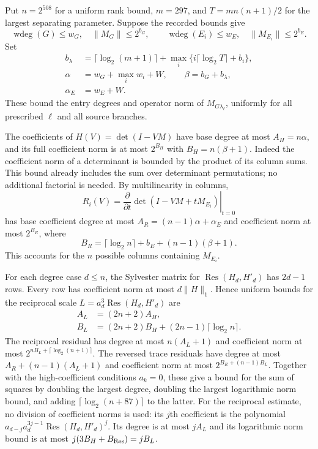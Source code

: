Put $n=2^{508}$ for a uniform rank bound, $m=297$, and
$T=m n(n+1)/2$ for the largest separating parameter. Suppose the
recorded bounds give
\[
 \operatorname{wdeg}(G)\le w_G,\quad \|M_G\|\le2^{b_G},\qquad
 \operatorname{wdeg}(E_i)\le w_E,\quad \|M_{E_i}\|\le2^{b_E}.
\]
Set
\begin{align*}
 b_\lambda&=\lceil\log_2(m+1)\rceil
       +\max_i\{i\lceil\log_2 T\rceil+b_i\},\\
 \alpha&=w_G+\max_i w_i+W,\qquad \beta=b_G+b_\lambda,\\
 \alpha_E&=w_E+W.
\end{align*}
These bound the entry degrees and operator norm of
$M_{G\lambda_\ell}$, uniformly for all prescribed $\ell$ and all
source branches.

The coefficients of $H(V)=\det(I-VM)$ have base degree at most
$A_H=n\alpha$, and its full coefficient norm is at most
$2^{B_H}$ with $B_H=n(\beta+1)$. Indeed the coefficient norm of a
determinant is bounded by the product of its column sums. This bound
already includes the sum over determinant permutations; no additional
factorial is needed. By multilinearity in columns,
\[
 R_i(V)=\left.\frac{\partial}{\partial t}
       \det(I-VM+tM_{E_i})\right|_{t=0}
\]
has base coefficient degree at most
$A_R=(n-1)\alpha+\alpha_E$ and coefficient norm at most $2^{B_R}$,
where
\[
 B_R=\lceil\log_2 n\rceil+b_E+(n-1)(\beta+1).
\]
This accounts for the $n$ possible columns containing $M_{E_i}$.

For each degree case $d\le n$, the Sylvester matrix for
$\operatorname{Res}(H_d,H'_d)$ has $2d-1$ rows. Every row has
coefficient norm at most $d\|H\|_1$. Hence uniform bounds for the
reciprocal scale $L=a_d^3\operatorname{Res}(H_d,H'_d)$ are
\begin{align*}
 A_L&=(2n+2)A_H,\\
 B_L&=(2n+2)B_H+(2n-1)\lceil\log_2 n\rceil.
\end{align*}
The reciprocal residual has degree at most $n(A_L+1)$ and coefficient
norm at most $2^{nB_L+\lceil\log_2(n+1)\rceil}$. The reversed trace
residuals have degree at most $A_R+(n-1)(A_L+1)$ and coefficient norm
at most $2^{B_R+(n-1)B_L}$. Together with the high-coefficient
conditions $a_k=0$, these give a bound for the sum of squares by
doubling the largest degree, doubling the largest logarithmic norm
bound, and adding $\lceil\log_2(n+87)\rceil$ to the latter.
For the reciprocal estimate, no division of coefficient norms is used:
its $j$th coefficient is the polynomial
$a_{d-j}a_d^{3j-1}\operatorname{Res}(H_d,H'_d)^j$.
Its degree is at most $jA_L$ and its logarithmic norm bound is at most
$j(3B_H+B_{\rm Res})=jB_L$.

